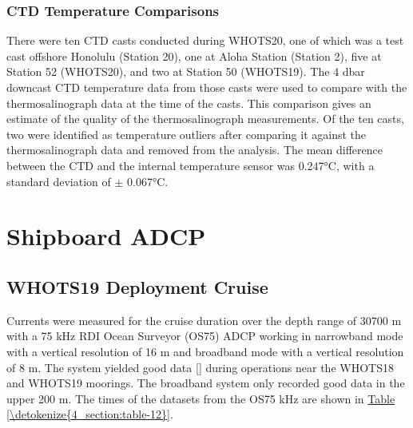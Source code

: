 \documentclass[a4paper,10pt,english,openany,oneside]{sphinxmanual}
\begin{document}
\subsubsection{CTD Temperature Comparisons}
\label{\detokenize{4_section:id11}}
\sphinxAtStartPar
There were ten CTD casts conducted during WHOTS\sphinxhyphen{}20, one of which was a test
cast offshore Honolulu (Station 20), one at Aloha Station (Station 2), five at
Station 52 (WHOTS\sphinxhyphen{}20), and
two at Station 50 (WHOTS\sphinxhyphen{}19). The 4 dbar downcast
CTD temperature data from those casts were used to compare with the
thermosalinograph data at the time of the casts. This comparison gives an
estimate of the quality of the thermosalinograph measurements. Of the ten
casts, two were identified as temperature outliers after comparing it
against the thermosalinograph data and removed from the analysis. The mean
difference between the CTD and the internal temperature sensor was
\sphinxhyphen{}0.247°C, with a standard deviation of \(\pm\) 0.067°C.


\section{Shipboard ADCP}
\label{\detokenize{4_section:shipboard-adcp}}

\subsection{WHOTS\sphinxhyphen{}19 Deployment Cruise}
\label{\detokenize{4_section:whots-19-deployment-cruise}}
\sphinxAtStartPar
Currents were measured for the cruise duration over the depth range of 30\sphinxhyphen{}700 m
with a 75 kHz RDI Ocean Surveyor (OS75) ADCP working in narrowband mode with a
vertical resolution of 16 m and broadband mode with a vertical resolution of 8
m. The system yielded good data {[}{]}
during operations near the WHOTS\sphinxhyphen{}18 and WHOTS\sphinxhyphen{}19 moorings. The broadband system
only recorded good data in the upper 200 m. The times of the datasets from the
OS75 kHz are shown in \hyperref[\detokenize{4_section:table-12}]{Table \ref{\detokenize{4_section:table-12}}}.
\end{document}
